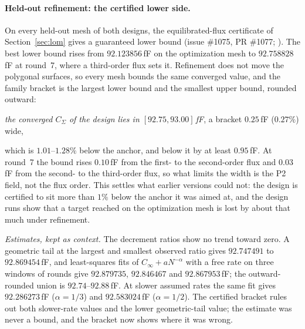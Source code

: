 \documentclass{anvil-paper}
\begin{document}
\paragraph{Held-out refinement: the certified lower side.}
On every held-out mesh of both designs, the equilibrated-flux
certificate of Section~\ref{sec:lom} gives a guaranteed lower bound
(issue \#1075, PR \#1077;
).
The best lower bound rises from $92.123856$\,fF on the optimization mesh
to $92.758828$\,fF at round~7, where a third-order flux sets it.
Refinement does not move the polygonal surfaces, so every mesh bounds
the same converged value, and the family bracket is the largest lower
bound and the smallest upper bound, rounded outward:
\begin{center}
  \emph{the converged $C_\Sigma$ of the design lies in
  $[92.75, 93.00]$\,fF}, a bracket $0.25$\,fF ($0.27\%$) wide,
\end{center}
which is $1.01$--$1.28\%$ below the anchor, and below it by at least
$0.95$\,fF. At round~7 the bound rises $0.10$\,fF from the first- to the
second-order flux and $0.03$\,fF from the second- to the third-order
flux, so what limits the width is the P2 field, not the flux order. This
settles what earlier versions could not: the design is certified to sit
more than $1\%$ below the anchor it was aimed at, and the design runs
show that a target reached on the optimization mesh is lost by about
that much under refinement.

\emph{Estimates, kept as context.} The decrement ratios show no trend
toward zero. A geometric tail at the largest and smallest observed
ratio gives $92.747491$ to $92.869454$\,fF, and least-squares fits of
$C_\infty + a N^{-\alpha}$ with a free rate on three windows of rounds
give $92.879735$, $92.846467$ and $92.867953$\,fF; the outward-rounded
union is $92.74$--$92.88$\,fF. At slower assumed rates the same fit
gives $92.286273$\,fF ($\alpha = 1/3$) and $92.583024$\,fF
($\alpha = 1/2$). The certified bracket rules out both slower-rate
values and the lower geometric-tail value; the estimate was never a
bound, and the bracket now shows where it was wrong.
\end{document}
